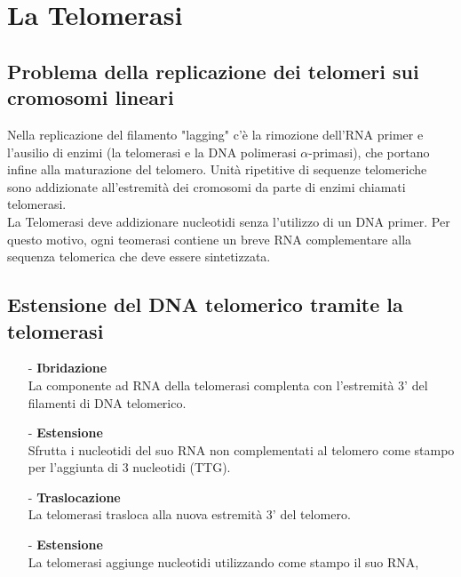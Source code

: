 \documentclass{article}
\begin{document}
\section{La Telomerasi} 
\subsection{Problema della replicazione dei telomeri sui cromosomi lineari} Nella replicazione del filamento "lagging" c'è la rimozione dell'RNA primer e l'ausilio di enzimi (la telomerasi e la DNA polimerasi $ \alpha $-primasi), che portano infine alla maturazione del telomero.
Unità ripetitive di sequenze telomeriche sono addizionate all'estremità dei cromosomi da parte di enzimi chiamati telomerasi.\\
La Telomerasi deve addizionare nucleotidi senza l'utilizzo di un DNA primer. Per questo motivo, ogni teomerasi contiene un breve RNA complementare alla sequenza telomerica che deve essere sintetizzata.
\subsection{Estensione del DNA telomerico tramite la telomerasi}
\begin{itemize}
    \item [-]\textbf{Ibridazione}\\
    La componente ad RNA della telomerasi complenta con l'estremità 3' del filamenti di DNA telomerico.
    \item [-]\textbf{Estensione}\\
    Sfrutta i nucleotidi del suo RNA  non complementati al telomero come stampo per l'aggiunta di 3 nucleotidi (TTG).
    \item [-]\textbf{Traslocazione}\\
    La telomerasi trasloca alla nuova estremità 3' del telomero.
    \item [-]\textbf{Estensione}\\
    La telomerasi aggiunge nucleotidi utilizzando come stampo il suo RNA,
\end{itemize}
\end{document}
